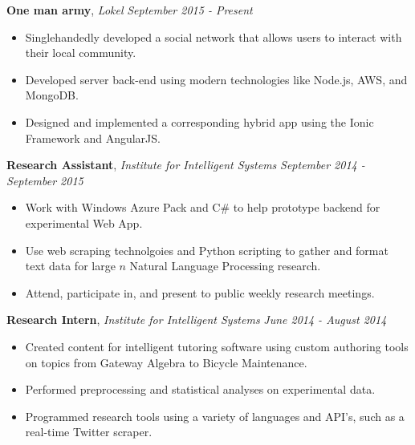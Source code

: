 \documentclass[9pt]{article}
\newenvironment{changemargin}[2]{%
  \begin{list}{}{%
    \setlength{\topsep}{0pt}%
    \setlength{\leftmargin}{#1}%
    \setlength{\rightmargin}{#2}%
    \setlength{\listparindent}{\parindent}%
    \setlength{\itemindent}{\parindent}%
    \setlength{\parsep}{\parskip}%
  }%
  \item[]}{\end{list}
}
\newenvironment{body} {
	\vspace*{-16pt}
	\begin{changemargin}{-0.25in}{-0.5in}
  }	
	{\end{changemargin}
}
\begin{document}
\begin{body}
	\vspace{14pt}
	
	\textbf{One man army}, \emph{Lokel} \hfill \emph{September 2015 - Present}\\
	\vspace*{-4pt}
	\begin{itemize} \itemsep -0pt  %
		\item Singlehandedly developed a social network that allows users to interact with their local community.
		\item Developed server back-end using modern technologies like Node.js, AWS, and MongoDB.
		\item Designed and implemented a corresponding hybrid app using the Ionic Framework and AngularJS.
	\end{itemize}
    
	\textbf{Research Assistant}, \emph{Institute for Intelligent Systems} \hfill \emph{September 2014 - September 2015}\\
	\vspace*{-4pt}
	\begin{itemize} \itemsep -0pt  %
		\item Work with Windows Azure Pack and C\# to help prototype backend for experimental Web App.
		\item Use web scraping technolgoies and Python scripting to gather and format text data for large $n$ Natural Language Processing research.
		\item Attend, participate in, and present to public weekly research meetings.
	\end{itemize}
	
	\textbf{Research Intern}, \emph{Institute for Intelligent Systems} \hfill \emph{June 2014 - August 2014}\\
	\vspace*{-4pt}
	\begin{itemize} \itemsep -0pt  %
		\item Created content for intelligent tutoring software using custom authoring tools on topics from Gateway Algebra to Bicycle Maintenance.
		\item Performed preprocessing and statistical analyses on experimental data.
		\item Programmed research tools using a variety of languages and API's, such as a real-time Twitter scraper.
	\end{itemize}
	


\end{body}
\end{document}
